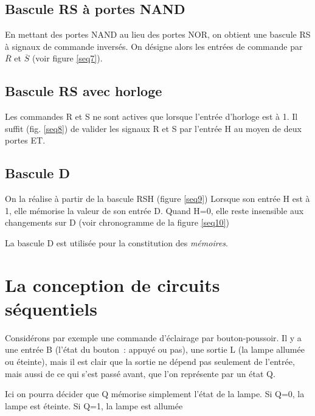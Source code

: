 \subsection{Bascule RS \`a portes NAND}

En mettant des portes NAND au lieu des portes NOR, on obtient une
bascule RS à signaux de commande invers\'es. On d\'esigne alors les
entr\'ees de commande par $\overline{R}$ et $\overline{S}$ (voir
figure \ref{seq7}).



\subsection{Bascule RS avec horloge}

Les commandes R et S ne sont actives que lorsque l'entr\'ee d'horloge est 
\`a 1. Il suffit (fig. \ref{seq8}) de valider les signaux R et S par l'entr\'ee
H au moyen de deux portes ET.

\subsection{Bascule D}

On la r\'ealise \`a partir de la bascule RSH (figure \ref{seq9})
Lorsque son entr\'ee H est \`a 1, elle m\'emorise la valeur de son entr\'ee D.
Quand H=0, elle reste insensible aux changements sur D (voir chronogramme
de la figure \ref{seq10})


La bascule D est  utilis\'ee pour la constitution des {\em m\'emoires}.

 
\section{La conception de circuits s\'equentiels}


Consid\'erons par exemple une commande d'\'eclairage 
par bouton-poussoir.  Il y a une entr\'ee B (l'\'etat du bouton~: appuy\'e ou
pas), une sortie L (la lampe allum\'ee ou \'eteinte), mais il est clair que
la sortie ne d\'epend pas seulement de l'entr\'ee, mais aussi de 
ce qui s'est pass\'e avant, que l'on repr\'esente par un \'etat Q.

Ici on pourra d\'ecider que Q m\'emorise simplement l'\'etat de la lampe.
	Si Q=0,	la lampe est \'eteinte.
	Si Q=1,	la lampe est allum\'ee

